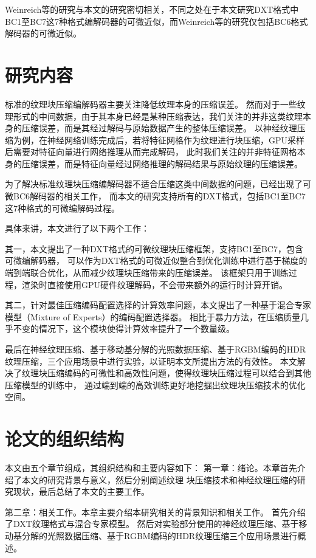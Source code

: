 Weinreich等的研究与本文的研究密切相关，不同之处在于本文研究DXT格式中BC1至BC7这7种格式编解码器的可微近似，而Weinreich等的研究仅包括BC6格式解码器的可微近似。

\section{研究内容}

标准的纹理块压缩编解码器主要关注降低纹理本身的压缩误差。
然而对于一些纹理形式的中间数据，由于其本身已经是某种压缩表达，我们关注的并非这类纹理本身的压缩误差，而是其经过解码与原始数据产生的整体压缩误差。
以神经纹理压缩为例，在神经网络训练完成后，若将特征网格作为纹理进行块压缩，GPU采样后需要对特征向量进行网络推理从而完成解码，
此时我们关注的并非特征网格本身的压缩误差，而是特征向量经过网络推理的解码结果与原始纹理的压缩误差。

为了解决标准纹理块压缩编解码器不适合压缩这类中间数据的问题，已经出现了可微BC6解码器的相关工作\cite{weinreich2024real}，
而本文的研究支持所有的DXT格式，包括BC1至BC7这7种格式的可微编解码过程。

具体来讲，本文进行了以下两个工作：

其一，本文提出了一种DXT格式的可微纹理块压缩框架，支持BC1至BC7，包含可微编解码器，
可以作为DXT格式的可微近似整合到优化训练中进行基于梯度的端到端联合优化，从而减少纹理块压缩带来的压缩误差。
该框架只用于训练过程，渲染时直接使用GPU硬件纹理解码，不会带来额外的运行时计算开销。

其二，针对最佳压缩编码配置选择的计算效率问题，本文提出了一种基于混合专家模型（Mixture of Experts）的编码配置选择器。
相比于暴力方法，在压缩质量几乎不变的情况下，这个模块使得计算效率提升了一个数量级。

最后在神经纹理压缩、基于移动基分解的光照数据压缩、基于RGBM编码的HDR纹理压缩，三个应用场景中进行实验，以证明本文所提出方法的有效性。
本文解决了纹理块压缩编码的可微性和高效性问题，使得纹理块压缩过程可以结合到其他压缩模型的训练中，
通过端到端的高效训练更好地挖掘出纹理块压缩技术的优化空间。

\section{论文的组织结构}

本文由五个章节组成，其组织结构和主要内容如下：
第一章：绪论。本章首先介绍了本文的研究背景与意义，然后分别阐述纹理
块压缩技术和神经纹理压缩的研究现状，最后总结了本文的主要工作。

第二章：相关工作。本章主要介绍本研究相关的背景知识和相关工作。
首先介绍了DXT纹理格式与混合专家模型。
然后对实验部分使用的神经纹理压缩、基于移动基分解的光照数据压缩、基于RGBM编码的HDR纹理压缩三个应用场景进行概述。

